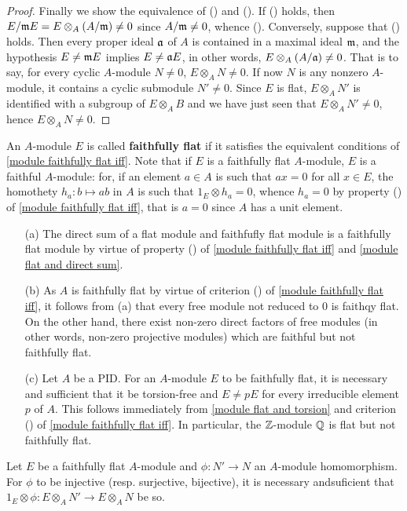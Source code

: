 \begin{proof}
Finally we show the equivalence of () and (). If () holds, then $E/\mathfrak{m} E=E\otimes_A(A/\mathfrak{m})\neq 0$ since $A/\mathfrak{m}\neq 0$, whence (). Conversely, suppose that () holds. Then every proper ideal $\mathfrak{a}$ of $A$ is contained in a maximal ideal $\mathfrak{m}$, and the hypothesis $E\neq\mathfrak{m} E$ implies $E\neq\mathfrak{a} E$, in other words, $E\otimes_A(A/\mathfrak{a})\neq 0$. That is to say, for every cyclic $A$-module $N\neq 0$, $E\otimes_AN\neq 0$. If now $N$ is any nonzero $A$-module, it contains a cyclic submodule $N'\neq 0$. Since $E$ is flat, $E\otimes_AN'$ is identified with a subgroup of $E\otimes_AB$ and we have just seen that $E\otimes_AN'\neq 0$, hence $E\otimes_AN\neq 0$.
\end{proof}
An $A$-module $E$ is called \textbf{faithfully flat} if it satisfies the equivalent conditions of \cref{module faithfully flat iff}. Note that if $E$ is a faithfully flat $A$-module, $E$ is a faithful $A$-module: for, if an element $a\in A$ is such that $ax=0$ for all $x\in E$, the homothety $h_a:b\mapsto ab$ in $A$ is such that $1_E\otimes h_a=0$, whence $h_a=0$ by property () of \cref{module faithfully flat iff}, that is $a=0$ since $A$ has a unit element.
\begin{example}
\mbox{}
\begin{itemize}
\item[(a)] The direct sum of a flat module and faithfufly flat module is a faithfully flat module by virtue of property () of \cref{module faithfully flat iff} and \cref{module flat and direct sum}.
\item[(b)] As $A$ is faithfully flat by virtue of criterion () of \cref{module faithfully flat iff}, it follows from (a) that every free module not reduced to $0$ is faithqy flat. On the other hand, there exist non-zero direct factors of free modules (in other words, non-zero projective modules) which are faithful but not faithfully flat.
\item[(c)] Let $A$ be a PID. For an $A$-module $E$ to be faithfully flat, it is necessary and sufficient that it be torsion-free and $E\neq pE$ for every irreducible element $p$ of $A$. This follows immediately from \cref{module flat and torsion} and criterion () of \cref{module faithfully flat iff}. In particular, the $\mathbb{Z}$-module $\mathbb{Q}$ is flat but not faithfully flat.
\end{itemize}
\end{example}
\begin{proposition}\label{module faithfully flat inj sur iff}
Let $E$ be a faithfully flat $A$-module and $\phi:N'\to N$ an $A$-module homomorphism. For $\phi$ to be injective (resp. surjective, bijective), it is necessary andsuficient that $1_E\otimes\phi:E\otimes_AN'\to E\otimes_AN$ be so.
\end{proposition}
